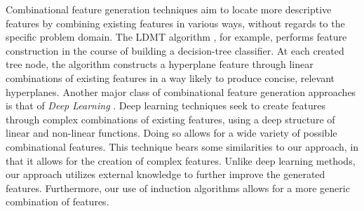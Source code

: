 \documentclass[twoside,11pt]{article}
\theoremstyle{definition}
\begin{document}
Combinational feature generation techniques aim to locate more descriptive features by combining existing features in various ways, without regards to the specific problem domain. The LDMT algorithm \cite{utgo1991linear}, for example, performs feature construction in the course of building a decision-tree classifier. At each created tree node, the algorithm constructs a hyperplane feature through linear combinations of existing features in a way likely to produce concise, relevant hyperplanes. 
Another major class of combinational feature generation approaches is that of \emph{Deep Learning} . Deep learning techniques seek to create features through complex combinations of existing features, using a deep structure of linear and non-linear functions.
Doing so allows for a wide variety of possible combinational features.
This technique bears some similarities to our approach, in that it allows for the creation of complex features. Unlike deep learning methods, our approach utilizes external knowledge to further improve the generated features. Furthermore, our use of induction algorithms allows for a more generic combination of features.
\end{document}
